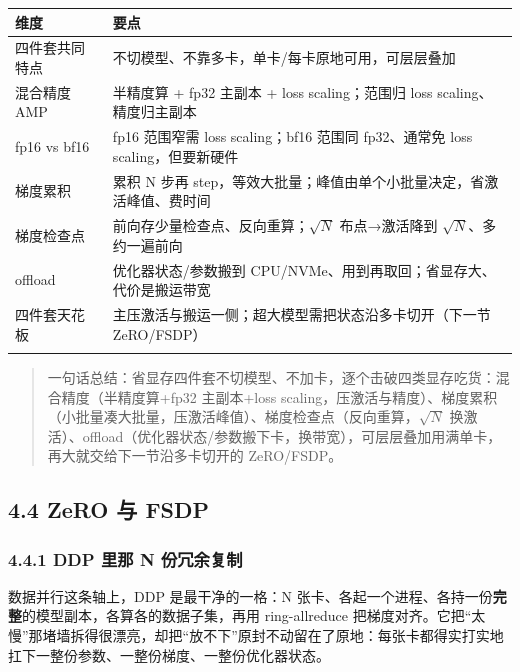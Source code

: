\documentclass[
  chinese,
]{ctexart}
\begin{document}
\begin{center}
\begin{tabular}{@{}>{\raggedright\arraybackslash}p{} >{\raggedright\arraybackslash}p{}@{}}
\toprule\noalign{}
维度 & 要点 \\
\midrule\noalign{}
四件套共同特点 & 不切模型、不靠多卡，单卡/每卡原地可用，可层层叠加 \\
混合精度 AMP & 半精度算 + fp32 主副本 + loss scaling；范围归 loss scaling、精度归主副本 \\
fp16 vs bf16 & fp16 范围窄需 loss scaling；bf16 范围同 fp32、通常免 loss scaling，但要新硬件 \\
梯度累积 & 累积 N 步再 step，等效大批量；峰值由单个小批量决定，省激活峰值、费时间 \\
梯度检查点 & 前向存少量检查点、反向重算；\(\sqrt N\) 布点→激活降到 \(\sqrt N\)、多约一遍前向 \\
offload & 优化器状态/参数搬到 CPU/NVMe、用到再取回；省显存大、代价是搬运带宽 \\
四件套天花板 & 主压激活与搬运一侧；超大模型需把状态沿多卡切开（下一节 ZeRO/FSDP） \\
\bottomrule\noalign{}
\end{tabular}
\end{center}

\begin{quote}
一句话总结：省显存四件套不切模型、不加卡，逐个击破四类显存吃货：混合精度（半精度算+fp32
主副本+loss
scaling，压激活与精度）、梯度累积（小批量凑大批量，压激活峰值）、梯度检查点（反向重算，\(\sqrt N\)
换激活）、offload（优化器状态/参数搬下卡，换带宽），可层层叠加用满单卡，再大就交给下一节沿多卡切开的
ZeRO/FSDP。
\end{quote}

\subsection{4.4 ZeRO 与 FSDP}\label{zero-ux4e0e-fsdp}

\subsubsection{4.4.1 DDP 里那 N
份冗余复制}\label{ddp-ux91ccux90a3-n-ux4efdux5197ux4f59ux590dux5236}

数据并行这条轴上，DDP 是最干净的一格：N
张卡、各起一个进程、各持一份\textbf{完整}的模型副本，各算各的数据子集，再用
ring-allreduce
把梯度对齐。它把``太慢''那堵墙拆得很漂亮，却把``放不下''原封不动留在了原地：每张卡都得实打实地扛下一整份参数、一整份梯度、一整份优化器状态。
\end{document}
